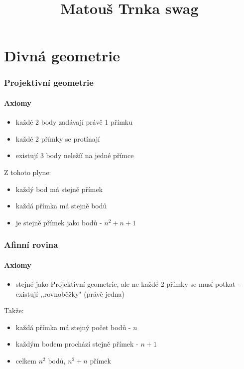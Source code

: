 \documentclass{article}
\title{\vspace{-2cm}Matouš Trnka swag\vspace{-1.7cm}}
\date{}
\author{}
\begin{document}
\maketitle

\part{Divná geometrie}

\section{Projektivní geometrie}

\subsection{Axiomy}
\begin{itemize}
  \item každé 2 body zadávají právě 1 přímku
  \item každé 2 přímky se protínají
  \item existují 3 body neležíí na jedné přímce
\end{itemize}
Z tohoto plyne:
\begin{itemize}
  \item každý bod má stejně přímek
  \item každá přímka má stejně bodů
  \item je stejně přímek jako bodů - $n^2+n+1$
\end{itemize}

\section{Afinní rovina}
\subsection{Axiomy}
\begin{itemize}
  \item stejné jako Projektivní geometrie, ale ne každé 2 přímky se musí potkat - existují ,,rovnoběžky" (právě jedna)
\end{itemize}
Takže:
\begin{itemize}
  \item každá přímka má stejný počet bodů - $n$
  \item každým bodem prochází stejně přímek - $n+1$
  \item celkem $n^2$ bodů, $n^2+n$ přímek
\end{itemize}
\end{document}
